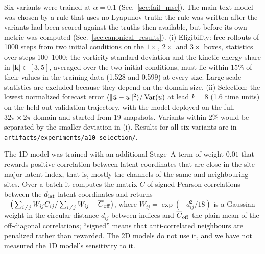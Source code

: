  Six variants were trained at
$\alpha=0.1$ (Sec.~\ref{sec:fail_mse}). The main-text model was chosen by a
rule that uses no Lyapunov truth; the rule was written after the variants
had been scored against the truths then available, but before its own
metric was computed (Sec.~\ref{sec:canonical_results}). (i)
Eligibility: free rollouts of 1000 steps from two initial conditions on
the $1\times$, $2\times$ and $3\times$ boxes, statistics over steps
100--1000; the vorticity standard deviation and the kinetic-energy share
in $|\bm k|\in[3,5]$, averaged over the two initial conditions, must lie
within $15\%$ of their values in the training data (1.528 and 0.599) at
every size. Large-scale statistics are excluded because they depend on the
domain size. (ii) Selection: the lowest normalized forecast error
$\langle\|\hat u-u\|^2\rangle/\operatorname{Var}(u)$ at lead $k=8$ (1.6 time units)
on the held-out validation trajectory, with the model deployed on the
full $32\pi\times2\pi$ domain and started from 19 snapshots. Variants
within $2\%$ would be separated by the smaller deviation in (i). Results
for all six variants are in \texttt{artifacts/experiments/a10\_selection/}.

 The 1D model was
trained with an additional Stage~A term of weight $0.01$ that rewards
positive correlation between latent coordinates that are close in the
site-major latent index, that is, mostly the channels of the same and
neighbouring sites. Over a batch it computes the matrix $C$ of signed Pearson
correlations between the $d_{\mathrm{lat}}$ latent coordinates and returns
$-\big(\sum_{i\neq j} W_{ij}C_{ij}/\sum_{i\neq j}W_{ij} - \overline{C}_{\rm off}\big)$,
where $W_{ij}=\exp(-d_{ij}^2/18)$ is a Gaussian weight in the circular
distance $d_{ij}$ between indices and $\overline{C}_{\rm off}$ the plain mean of the
off-diagonal correlations; ``signed'' means that anti-correlated
neighbours are penalized rather than rewarded. The 2D models do not use
it, and we have not measured the 1D model's sensitivity to it.

